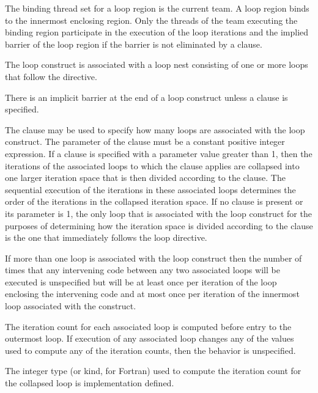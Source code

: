 \binding
The binding thread set for a loop region is the current team. A loop region binds to the 
innermost enclosing  region. Only the threads of the team executing the 
binding  region participate in the execution of the loop iterations and the 
implied barrier of the loop region if the barrier is not eliminated by a  clause.

\descr
The loop construct is associated with a loop nest consisting of one or more loops that 
follow the directive.

There is an implicit barrier at the end of a loop construct unless a  clause is 
specified.

The  clause may be used to specify how many loops are 
associated with the loop construct. The parameter of the  
clause must be a constant positive integer expression. If a  
clause is specified with a parameter value greater than 1, then the 
iterations of the associated loops to which the clause applies are collapsed 
into one larger iteration space that is then divided according 
to the  clause. The sequential execution of the iterations 
in these associated loops determines the order of the iterations in the 
collapsed iteration space. If no  clause is present or its 
parameter is 1, the only loop that is associated with the loop construct 
for the purposes of determining how the iteration space is divided according 
to the  clause is the one that immediately follows the 
loop directive. 

If more than one loop is associated with the loop construct then the
number of times that any intervening code between any two associated
loops will be executed is unspecified but will be at least once per
iteration of the loop enclosing the intervening code and at most once
per iteration of the innermost loop associated with the construct.

The iteration count for each associated loop is computed before entry to the 
outermost loop. If execution of any associated loop changes any of the values 
used to compute any of the iteration counts, then the behavior is unspecified.

The integer type (or kind, for Fortran) used to compute the iteration count 
for the collapsed loop is implementation defined.

